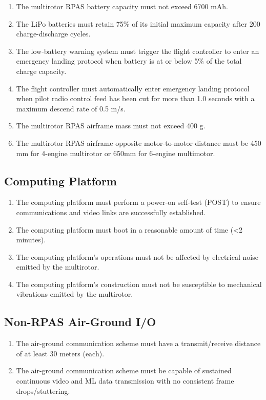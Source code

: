 \documentclass[10pt,letterpaper]{article}
\begin{document}
\begin{enumerate}[label=NF.DR.\arabic*, wide=1cm, widest=3cm, leftmargin=*, font=\bfseries, noitemsep,topsep=0pt, parsep=4pt, partopsep=0pt]
	\item The multirotor RPAS battery capacity must not exceed 6700 mAh.
	\item The LiPo batteries must retain 75\% of its initial maximum capacity after 200 charge-discharge cycles.\cite{lipobattery}
	\item The low-battery warning system must trigger the flight controller to enter an emergency landing protocol when battery is at or below 5\% of the total charge capacity.
	\item The flight controller must automatically enter emergency landing protocol when pilot radio control feed has been cut for more than 1.0 seconds with a maximum descend rate of 0.5 m/s.
	\item The multirotor RPAS airframe mass must not exceed 400 g.
	\item The multirotor RPAS airframe opposite motor-to-motor distance must be 450 mm for 4-engine multirotor or 650mm for 6-engine multimotor.
\end{enumerate}

\subsection{Computing Platform}
\begin{enumerate}[label=NF.CP.\arabic*, wide=1cm, widest=3cm, leftmargin=*, font=\bfseries, noitemsep,topsep=0pt, parsep=4pt, partopsep=0pt]
	\item The computing platform must perform a power-on self-test (POST) to ensure communications and video links are successfully established.
	\item The computing platform must boot in a reasonable amount of time (<2 minutes).
	\item The computing platform's operations must not be affected by electrical noise emitted by the multirotor.	
	\item The computing platform's construction must not be susceptible to mechanical vibrations emitted by the multirotor.	
\end{enumerate}

\subsection{Non-RPAS Air-Ground I/O}
\begin{enumerate}[label=NF.CM.\arabic*, wide=1cm, widest=3cm, leftmargin=*, font=\bfseries, noitemsep,topsep=0pt, parsep=4pt, partopsep=0pt]
	\item The air-ground communication scheme must have a transmit/receive distance of at least 30 meters (each).
	\item The air-ground communication scheme must be capable of sustained continuous video and ML data transmission with no consistent frame drops/stuttering.
\end{enumerate}
\end{document}
